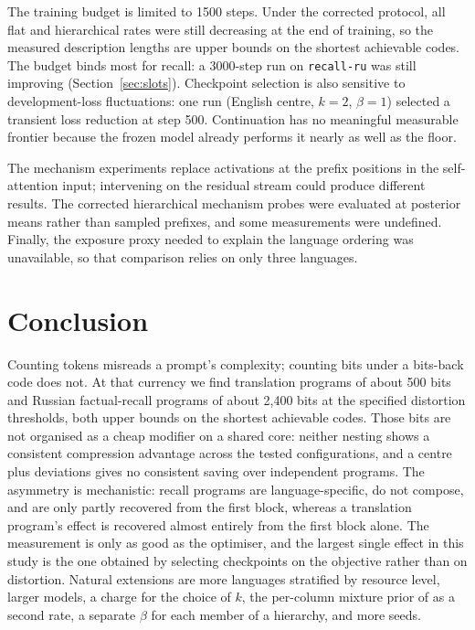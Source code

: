 \documentclass{article}
\newcommand{\cell}[1]{\texttt{#1}}
\begin{document}
The training budget is limited to 1500 steps. Under the corrected protocol, all flat and hierarchical rates were still decreasing at the end of training, so the measured description lengths are upper bounds on the shortest achievable codes. The budget binds most for recall: a 3000-step run on \cell{recall-ru} was still improving (Section~\ref{sec:slots}). Checkpoint selection is also sensitive to development-loss fluctuations: one run (English centre, $k=2$, $\beta=1$) selected a transient loss reduction at step 500. Continuation has no meaningful measurable frontier because the frozen model already performs it nearly as well as the floor.

The mechanism experiments replace activations at the prefix positions in the self-attention input; intervening on the residual stream could produce different results. The corrected hierarchical mechanism probes were evaluated at posterior means rather than sampled prefixes, and some measurements were undefined. Finally, the exposure proxy needed to explain the language ordering was unavailable, so that comparison relies on only three languages.

\section{Conclusion}
Counting tokens misreads a prompt's complexity; counting bits under a bits-back code does not. At that currency we find translation programs of about 500 bits and Russian factual-recall programs of about 2,400 bits at the specified distortion thresholds, both upper bounds on the shortest achievable codes. Those bits are not organised as a cheap modifier on a shared core: neither nesting shows a consistent compression advantage across the tested configurations, and a centre plus deviations gives no consistent saving over independent programs. The asymmetry is mechanistic: recall programs are language-specific, do not compose, and are only partly recovered from the first block, whereas a translation program's effect is recovered almost entirely from the first block alone. The measurement is only as good as the optimiser, and the largest single effect in this study is the one obtained by selecting checkpoints on the objective rather than on distortion. Natural extensions are more languages stratified by resource level, larger models, a charge for the choice of $k$, the per-column mixture prior of \citet{shaw2026bridging} as a second rate, a separate $\beta$ for each member of a hierarchy, and more seeds.
\end{document}
